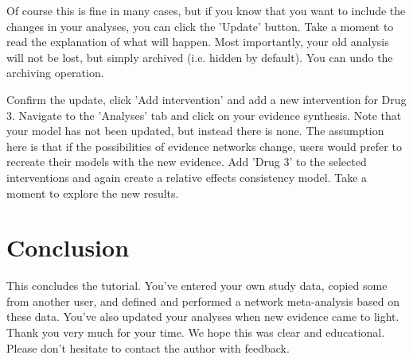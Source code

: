 \documentclass[12pt]{article}
\begin{document}
Of course this is fine in many cases, but if you know that you want to include the changes in your analyses, you can click the 'Update' button.
Take a moment to read the explanation of what will happen.
Most importantly, your old analysis will not be lost, but simply archived (i.e. hidden by default).
You can undo the archiving operation.

Confirm the update, click 'Add intervention' and add a new intervention for Drug 3.
Navigate to the 'Analyses' tab and click on your evidence synthesis. 
Note that your model has not been updated, but instead there is none.
The assumption here is that if the possibilities of evidence networks change, users would prefer to recreate their models with the new evidence.
Add 'Drug 3' to the selected interventions and again create a relative effects consistency model.
Take a moment to explore the new results. 

\section{Conclusion}

This concludes the tutorial.
You've entered your own study data, copied some from another user, and defined and performed a network meta-analysis based on these data.
You've also updated your analyses when new evidence came to light.
Thank you very much for your time.
We hope this was clear and educational.
Please don't hesitate to contact the author with feedback.
\end{document}
